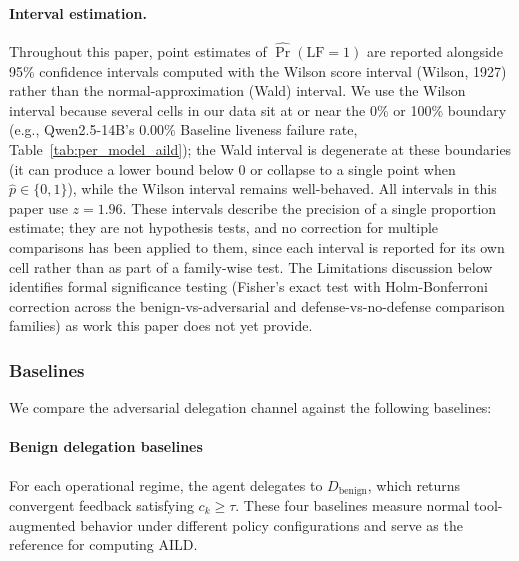 \documentclass[conference]{IEEEtran}
\begin{document}
\paragraph{Interval estimation.}
Throughout this paper, point estimates of $\widehat{\Pr}(\mathrm{LF}=1)$ are reported alongside 95\% confidence intervals computed with the Wilson score interval (Wilson, 1927) rather than the normal-approximation (Wald) interval. We use the Wilson interval because several cells in our data sit at or near the 0\% or 100\% boundary (e.g., Qwen2.5-14B's 0.00\% Baseline liveness failure rate, Table~\ref{tab:per_model_aild}); the Wald interval is degenerate at these boundaries (it can produce a lower bound below 0 or collapse to a single point when $\hat{p} \in \{0,1\}$), while the Wilson interval remains well-behaved. All intervals in this paper use $z=1.96$. These intervals describe the precision of a single proportion estimate; they are not hypothesis tests, and no correction for multiple comparisons has been applied to them, since each interval is reported for its own cell rather than as part of a family-wise test. The Limitations discussion below identifies formal significance testing (Fisher's exact test with Holm-Bonferroni correction across the benign-vs-adversarial and defense-vs-no-defense comparison families) as work this paper does not yet provide.

\subsubsection{Baselines}

We compare the adversarial delegation channel against the following baselines:


\paragraph{Benign delegation baselines}
For each operational regime, the agent delegates to $D_{\text{benign}}$, 
which returns convergent feedback satisfying $c_k \geq \tau$. These four baselines 
measure normal tool-augmented behavior under different policy configurations and serve 
as the reference for computing AILD.
\end{document}
